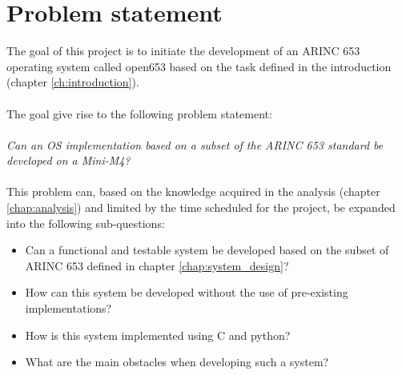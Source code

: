 \chapter{Problem statement}


The goal of this project is to initiate the development of an ARINC 653
operating system called open653 based on the task defined in the
introduction (chapter \ref{ch:introduction}).
\\\\
The goal give rise to the following problem statement:
\\\\
\textit{Can an OS implementation based on a subset of the ARINC 653 standard be
developed on a Mini-M4?}
\\\\
This problem can,
based on the knowledge acquired in the analysis (chapter \ref{chap:analysis})
and limited by the time scheduled for the project,
be expanded into the following sub-questions:

\begin{itemize}
	\item Can a functional and testable system be developed based on
		the subset of ARINC 653 defined in chapter \ref{chap:system_design}?
	\item How can this system be developed without the use of pre-existing
		implementations?
	\item How is this system implemented using C and python?
	\item What are the main obstacles when developing such a system?
\end{itemize}
